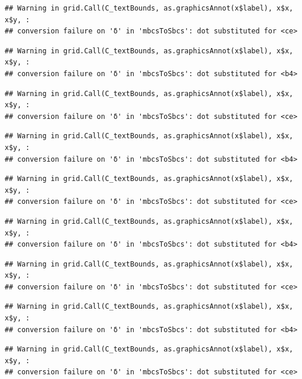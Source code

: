 \documentclass[]{article}
\begin{document}
\begin{verbatim}
## Warning in grid.Call(C_textBounds, as.graphicsAnnot(x$label), x$x, x$y, :
## conversion failure on 'δ' in 'mbcsToSbcs': dot substituted for <ce>
\end{verbatim}

\begin{verbatim}
## Warning in grid.Call(C_textBounds, as.graphicsAnnot(x$label), x$x, x$y, :
## conversion failure on 'δ' in 'mbcsToSbcs': dot substituted for <b4>
\end{verbatim}

\begin{verbatim}
## Warning in grid.Call(C_textBounds, as.graphicsAnnot(x$label), x$x, x$y, :
## conversion failure on 'δ' in 'mbcsToSbcs': dot substituted for <ce>
\end{verbatim}

\begin{verbatim}
## Warning in grid.Call(C_textBounds, as.graphicsAnnot(x$label), x$x, x$y, :
## conversion failure on 'δ' in 'mbcsToSbcs': dot substituted for <b4>
\end{verbatim}

\begin{verbatim}
## Warning in grid.Call(C_textBounds, as.graphicsAnnot(x$label), x$x, x$y, :
## conversion failure on 'δ' in 'mbcsToSbcs': dot substituted for <ce>
\end{verbatim}

\begin{verbatim}
## Warning in grid.Call(C_textBounds, as.graphicsAnnot(x$label), x$x, x$y, :
## conversion failure on 'δ' in 'mbcsToSbcs': dot substituted for <b4>
\end{verbatim}

\begin{verbatim}
## Warning in grid.Call(C_textBounds, as.graphicsAnnot(x$label), x$x, x$y, :
## conversion failure on 'δ' in 'mbcsToSbcs': dot substituted for <ce>
\end{verbatim}

\begin{verbatim}
## Warning in grid.Call(C_textBounds, as.graphicsAnnot(x$label), x$x, x$y, :
## conversion failure on 'δ' in 'mbcsToSbcs': dot substituted for <b4>
\end{verbatim}

\begin{verbatim}
## Warning in grid.Call(C_textBounds, as.graphicsAnnot(x$label), x$x, x$y, :
## conversion failure on 'δ' in 'mbcsToSbcs': dot substituted for <ce>
\end{verbatim}
\end{document}
